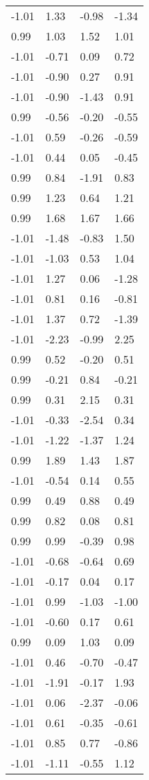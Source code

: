 \documentclass[
  doc,draftall]{apa6}
\begin{document}
\begin{table}[tbp]
\begin{center}
\begin{threeparttable}
\begin{tabular}{llll}
-1.01 & 1.33 & -0.98 & -1.34\\
0.99 & 1.03 & 1.52 & 1.01\\
-1.01 & -0.71 & 0.09 & 0.72\\
-1.01 & -0.90 & 0.27 & 0.91\\
-1.01 & -0.90 & -1.43 & 0.91\\
0.99 & -0.56 & -0.20 & -0.55\\
-1.01 & 0.59 & -0.26 & -0.59\\
-1.01 & 0.44 & 0.05 & -0.45\\
0.99 & 0.84 & -1.91 & 0.83\\
0.99 & 1.23 & 0.64 & 1.21\\
0.99 & 1.68 & 1.67 & 1.66\\
-1.01 & -1.48 & -0.83 & 1.50\\
-1.01 & -1.03 & 0.53 & 1.04\\
-1.01 & 1.27 & 0.06 & -1.28\\
-1.01 & 0.81 & 0.16 & -0.81\\
-1.01 & 1.37 & 0.72 & -1.39\\
-1.01 & -2.23 & -0.99 & 2.25\\
0.99 & 0.52 & -0.20 & 0.51\\
0.99 & -0.21 & 0.84 & -0.21\\
0.99 & 0.31 & 2.15 & 0.31\\
-1.01 & -0.33 & -2.54 & 0.34\\
-1.01 & -1.22 & -1.37 & 1.24\\
0.99 & 1.89 & 1.43 & 1.87\\
-1.01 & -0.54 & 0.14 & 0.55\\
0.99 & 0.49 & 0.88 & 0.49\\
0.99 & 0.82 & 0.08 & 0.81\\
0.99 & 0.99 & -0.39 & 0.98\\
-1.01 & -0.68 & -0.64 & 0.69\\
-1.01 & -0.17 & 0.04 & 0.17\\
-1.01 & 0.99 & -1.03 & -1.00\\
-1.01 & -0.60 & 0.17 & 0.61\\
0.99 & 0.09 & 1.03 & 0.09\\
-1.01 & 0.46 & -0.70 & -0.47\\
-1.01 & -1.91 & -0.17 & 1.93\\
-1.01 & 0.06 & -2.37 & -0.06\\
-1.01 & 0.61 & -0.35 & -0.61\\
-1.01 & 0.85 & 0.77 & -0.86\\
-1.01 & -1.11 & -0.55 & 1.12\\

\end{tabular}
\end{threeparttable}
\end{center}
\end{table}
\end{document}

